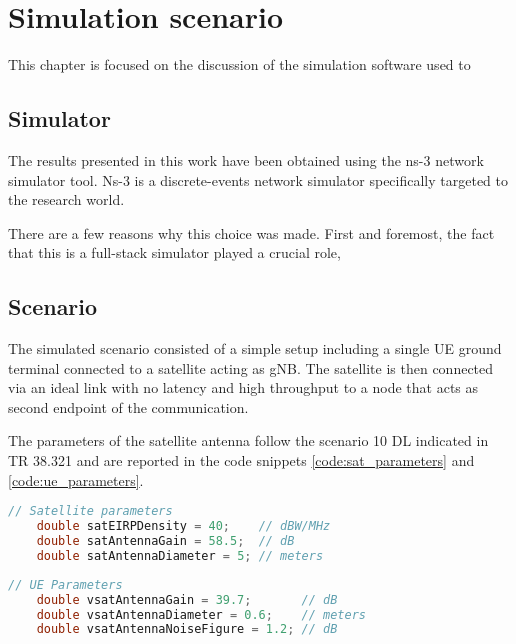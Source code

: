
\chapter{Simulation scenario}
\label{chp:simulation_scenario}

This chapter is focused on the discussion of the simulation software used to 
\section{Simulator}
The results presented in this work have been obtained using the ns-3 network simulator tool. Ns-3 is a discrete-events network simulator specifically targeted to the research world.

There are a few reasons why this choice was made. First and foremost, the fact that this is a full-stack simulator played a crucial role, 

\section{Scenario}
The simulated scenario consisted of a simple setup including a single \ac{UE} ground terminal connected to a satellite acting as \ac{gNB}. The satellite is then connected via an ideal link with no latency and high throughput to a node that acts as second endpoint of the communication.

The parameters of the satellite antenna follow the scenario 10 DL indicated in TR 38.321  and are reported in the code snippets \ref{code:sat_parameters} and \ref{code:ue_parameters}.

\begin{lstlisting}[language=C++, caption=Satellite antenna parameters, label=code:sat_parameters]
    // Satellite parameters
    double satEIRPDensity = 40;    // dBW/MHz
    double satAntennaGain = 58.5;  // dB
    double satAntennaDiameter = 5; // meters
\end{lstlisting}

\begin{lstlisting}[language=C++, caption=UE antenna parameters, label=code:ue_parameters]
    // UE Parameters
    double vsatAntennaGain = 39.7;       // dB
    double vsatAntennaDiameter = 0.6;    // meters
    double vsatAntennaNoiseFigure = 1.2; // dB 
\end{lstlisting}